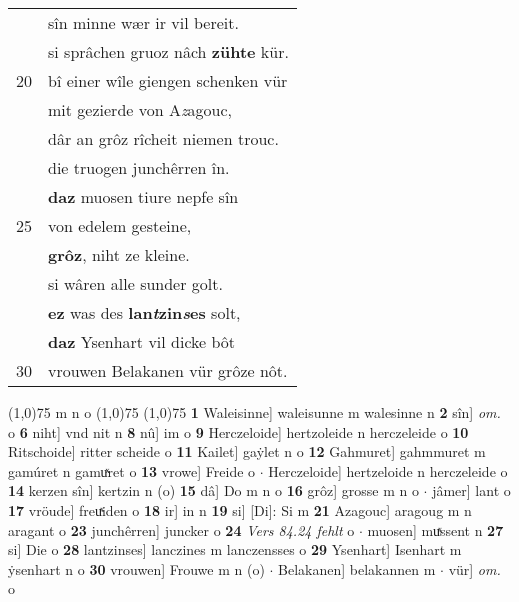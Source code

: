 \documentclass[8pt,a4paper,notitlepage]{article}
\begin{document}
\begin{table}[ht]
\begin{minipage}[t]{0.5\linewidth}
\begin{tabular}{rl}
 & sîn minne wær ir vil bereit.\\ 
 & si sprâchen gruoz nâch \textbf{zühte} kür.\\ 
20 & bî einer wîle giengen schenken vür\\ 
 & mit gezierde von A\textit{z}agouc,\\ 
 & dâr an grôz rîcheit niemen trouc.\\ 
 & die truogen junchêrren în.\\ 
 & \textbf{daz} muosen tiure nepfe sîn\\ 
25 & von edelem gesteine,\\ 
 & \textbf{grôz}, niht ze kleine.\\ 
 & si wâren alle sunder golt.\\ 
 & \textbf{ez} was des \textbf{lan\textit{t}zin\textit{s}es} solt,\\ 
 & \textbf{daz} Ysenhart vil dicke bôt\\ 
30 & vrouwen Belakanen vür grôze nôt.\\ 
\end{tabular}
\scriptsize
\line(1,0){75} \newline
m n o \newline
\line(1,0){75} \newline
\newline
\line(1,0){75} \newline
\textbf{1} Waleisinne] waleisunne m walesinne n \textbf{2} sîn] \textit{om.} o \textbf{6} niht] vnd nit n \textbf{8} nû] im o \textbf{9} Herczeloide] hertzoleide n herczeleide o \textbf{10} Ritschoide] ritter scheide o \textbf{11} Kailet] gaẏlet n o \textbf{12} Gahmuret] gahmmuret m gamúret n gamuͯret o \textbf{13} vrowe] Freide o  $\cdot$ Herczeloide] hertzeloide n herczeleide o \textbf{14} kerzen sîn] kertzin n (o) \textbf{15} dâ] Do m n o \textbf{16} grôz] grosse m n o  $\cdot$ jâmer] lant o \textbf{17} vröude] freuͯiden o \textbf{18} ir] in n \textbf{19} si] [Di]: Si m \textbf{21} Azagouc] aragoug m n aragant o \textbf{23} junchêrren] juncker o \textbf{24} \textit{Vers 84.24 fehlt} o   $\cdot$ muosen] muͯssent n \textbf{27} si] Die o \textbf{28} lantzinses] lanczines m lanczensses o \textbf{29} Ysenhart] Isenhart m ẏsenhart n o \textbf{30} vrouwen] Frouwe m n (o)  $\cdot$ Belakanen] belakannen m  $\cdot$ vür] \textit{om.} o \newline
\end{minipage}
\end{table}
\newpage
\end{document}
